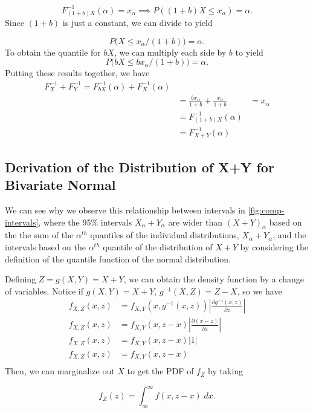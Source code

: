 \documentclass[12pt,twoside]{smiththesis}
\begin{document}
\[F^{-1}_{(1+b) X } (\alpha) = x_\alpha \implies P((1+b) X \leq x_\alpha) = \alpha.\]
Since \((1+b)\) is just a constant, we can divide to yield

\[P\Big( X \leq x_\alpha/(1+b) \Big) = \alpha.\]
To obtain the quantile for \(bX\), we can multiply each side by \(b\) to yield
\[P\Big( bX \leq bx_\alpha/(1+b) \Big) = \alpha.\]
Putting these results together, we have
\begin{align*}
F^{-1}_X+F^{-1}_Y = F^{-1}_{bX} (\alpha) + F^{-1}_{X} (\alpha) \\
&= \frac{bx_\alpha } { 1+b} + \frac{x_\alpha}{1+b}
&= x_\alpha \\
&= F^{-1}_{(1+b)X}(\alpha)\\
&=F^{-1}_{X+Y}(\alpha) \end{align*}

\hypertarget{derivation-of-the-distribution-of-xy-for-bivariate-normal}{%
\subsection{Derivation of the Distribution of X+Y for Bivariate Normal}\label{derivation-of-the-distribution-of-xy-for-bivariate-normal}}

We can see why we observe this relationship between intervals in \ref{fig:comp-intervals}, where the 95\% intervals \(X_\alpha +Y_\alpha\) are wider than \((X+Y)_\alpha\) based on the the sum of the \(\alpha^{th}\) quantiles of the individual distributions, \(X_\alpha + Y_\alpha\), and the intervals based on the \(\alpha^{th}\) quantile of the distribution of \(X+Y\) by considering the definition of the quantile function of the normal distribution.

Defining \(Z=g(X,Y) = X+Y\), we can obtain the density function by a change of variables. Notice if \(g(X,Y) = X+Y\), \(g^{-1}(X,Z) = Z-X\), so we have
\begin{align*} f_{X,Z}(x,z) &= f_{X,Y}(x,g^{-1}(x,z)) \left|\frac{\partial g^{-1}(x,z)}{\partial z}\right| \\
f_{X,Z}(x,z) &= f_{X,Y}(x,z-x) \left|\frac{\partial (x-z)}{\partial z}\right|\\
f_{X,Z}(x,z) &= f_{X,Y}(x,z-x) \left|1\right|\\
f_{X,Z}(x,z) &= f_{X,Y}(x,z-x) \\
\end{align*}
Then, we can marginalize out \(X\) to get the PDF of \(f_Z\) by taking

\[f_Z(z) = \int_{\infty}^\infty f(x,z-x) \; dx.\]
\end{document}
